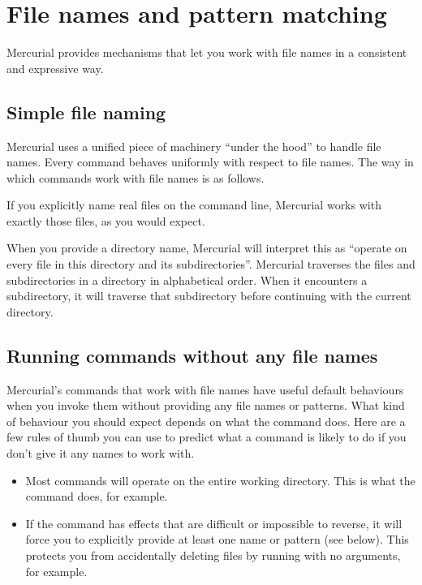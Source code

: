 \chapter{File names and pattern matching}
\label{chap:names}

Mercurial provides mechanisms that let you work with file names in a
consistent and expressive way.

\section{Simple file naming}

Mercurial uses a unified piece of machinery ``under the hood'' to
handle file names.  Every command behaves uniformly with respect to
file names.  The way in which commands work with file names is as
follows.

If you explicitly name real files on the command line, Mercurial works
with exactly those files, as you would expect.

When you provide a directory name, Mercurial will interpret this as
``operate on every file in this directory and its subdirectories''.
Mercurial traverses the files and subdirectories in a directory in
alphabetical order.  When it encounters a subdirectory, it will
traverse that subdirectory before continuing with the current
directory.

\section{Running commands without any file names}

Mercurial's commands that work with file names have useful default
behaviours when you invoke them without providing any file names or
patterns.  What kind of behaviour you should expect depends on what
the command does.  Here are a few rules of thumb you can use to
predict what a command is likely to do if you don't give it any names
to work with.
\begin{itemize}
\item Most commands will operate on the entire working directory.
  This is what the  command does, for example.
\item If the command has effects that are difficult or impossible to
  reverse, it will force you to explicitly provide at least one name
  or pattern (see below).  This protects you from accidentally
  deleting files by running  with no arguments, for
  example.
\end{itemize}

